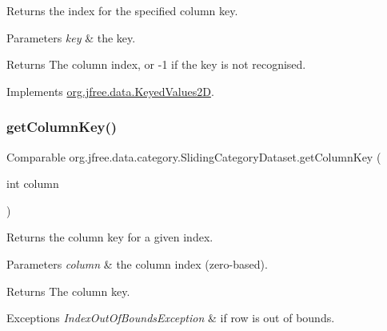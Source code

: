 Returns the index for the specified column key.


\begin{DoxyParams}{Parameters}
{\em key} & the key.\\
\hline
\end{DoxyParams}
\begin{DoxyReturn}{Returns}
The column index, or -\/1 if the key is not recognised. 
\end{DoxyReturn}


Implements \mbox{\hyperlink{interfaceorg_1_1jfree_1_1data_1_1_keyed_values2_d_a3360f2f612f16e8c90409d65e3992d38}{org.\+jfree.\+data.\+Keyed\+Values2D}}.

\mbox{\label{classorg_1_1jfree_1_1data_1_1category_1_1_sliding_category_dataset_aefb8cdefb6baf9ef40d25de9b5c33c63}} 
\subsubsection{\texorpdfstring{get\+Column\+Key()}{getColumnKey()}}
{\footnotesize\ttfamily Comparable org.\+jfree.\+data.\+category.\+Sliding\+Category\+Dataset.\+get\+Column\+Key (\begin{DoxyParamCaption}\item[{int}]{column }\end{DoxyParamCaption})}

Returns the column key for a given index.


\begin{DoxyParams}{Parameters}
{\em column} & the column index (zero-\/based).\\
\hline
\end{DoxyParams}
\begin{DoxyReturn}{Returns}
The column key.
\end{DoxyReturn}

\begin{DoxyExceptions}{Exceptions}
{\em Index\+Out\+Of\+Bounds\+Exception} & if {\ttfamily row} is out of bounds. \\
\hline
\end{DoxyExceptions}


